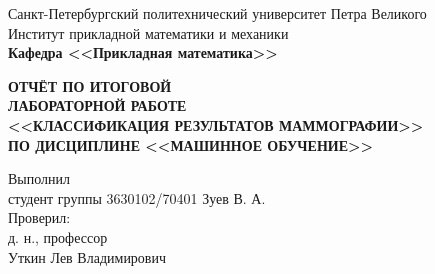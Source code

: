 \documentclass[main.tex]{subfiles}
\begin{document}
\begin{titlepage}
\begin{center}
	\begin{large}
		Санкт-Петербургский политехнический университет Петра Великого\\
		Институт прикладной математики и механики\\
		\textbf{Кафедра <<Прикладная математика>>}\\
	\end{large}
	\vfill
	\Large{\textbf{ОТЧЁТ ПО ИТОГОВОЙ \\
             ЛАБОРАТОРНОЙ РАБОТЕ\\
	<<КЛАССИФИКАЦИЯ РЕЗУЛЬТАТОВ МАММОГРАФИИ>>\\
	ПО ДИСЦИПЛИНЕ <<МАШИННОЕ ОБУЧЕНИЕ>>}}
\end{center}
\vfill
\flushleft
Выполнил\\
студент группы 3630102/70401
\flushright
Зуев В. А.\\
\flushleft
Проверил:\\
д. н., профессор\\
\flushright
Уткин Лев Владимирович\\
\vfill
{}
\end{titlepage}
\end{document}

